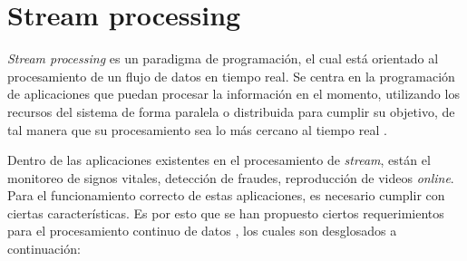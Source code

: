 \section{Stream processing}
\label{sec:streamProcessing}

\textit{Stream processing} es un paradigma de programación, el cual está orientado al procesamiento de un flujo de datos en tiempo real. Se centra en la programación de aplicaciones que puedan procesar la información en el momento, utilizando los recursos del sistema de forma paralela o distribuida para cumplir su objetivo, de tal manera que su procesamiento sea lo más cercano al tiempo real \citep{ChakravarthyJ09}.

Dentro de las aplicaciones existentes en el procesamiento de \textit{stream}, están el monitoreo de signos vitales, detección de fraudes, reproducción de videos \textit{online}. Para el funcionamiento correcto de estas aplicaciones, es necesario cumplir con ciertas características. Es por esto que se han propuesto ciertos requerimientos para el procesamiento continuo de datos \citep{andrade2014fundamentals}, los cuales son desglosados a continuación:

